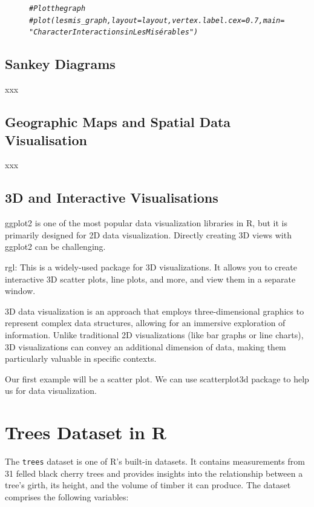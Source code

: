 \documentclass{article}\usepackage[]{graphicx}\usepackage[]{xcolor}
\makeatletter
\newcommand{\hlcom}[1]{\textcolor[rgb]{0.678,0.584,0.686}{\textit{#1}}}%
\newenvironment{kframe}{%
 \def\at@end@of@kframe{}%
 \ifinner\ifhmode%
  \def\at@end@of@kframe{\end{minipage}}%
  \begin{minipage}{\columnwidth}%
 \fi\fi%
 \def\FrameCommand##1{\hskip\@totalleftmargin \hskip-\fboxsep
 \colorbox{shadecolor}{##1}\hskip-\fboxsep
     \hskip-\linewidth \hskip-\@totalleftmargin \hskip\columnwidth}%
 \MakeFramed {\advance\hsize-\width
   \@totalleftmargin\z@ \linewidth\hsize
   \@setminipage}}%
 {\par\unskip\endMakeFramed%
 \at@end@of@kframe}
\newenvironment{knitrout}{}{} %
\makeatother
\begin{document}
\begin{figure}[h]
\centering
\begin{knitrout}
\color{fgcolor}\begin{kframe}
\begin{alltt}
\hlcom{# Plot the graph}
\hlcom{#plot(lesmis_graph, layout = layout, vertex.label.cex = 0.7, main = "Character Interactions in Les Misérables")}
\end{alltt}
\end{kframe}
\end{knitrout}
\end{figure}

\subsection{Sankey Diagrams}
xxx

\subsection{Geographic Maps and Spatial Data Visualisation}
xxx

\subsection{3D and Interactive Visualisations}
ggplot2 is one of the most popular data visualization libraries in R, but it is primarily designed for 2D data visualization. Directly creating 3D views with ggplot2 can be challenging.

rgl: This is a widely-used package for 3D visualizations. It allows you to create interactive 3D scatter plots, line plots, and more, and view them in a separate window.

3D data visualization is an approach that employs three-dimensional graphics to represent complex data structures, allowing for an immersive exploration of information. Unlike traditional 2D visualizations (like bar graphs or line charts), 3D visualizations can convey an additional dimension of data, making them particularly valuable in specific contexts.

Our first example will be  a scatter plot. We can use scatterplot3d package  to help us for data visualization.
\section{Trees Dataset in R}

The \texttt{trees} dataset is one of R's built-in datasets. It contains measurements from 31 felled black cherry trees and provides insights into the relationship between a tree's girth, its height, and the volume of timber it can produce. The dataset comprises the following variables:
\end{document}
